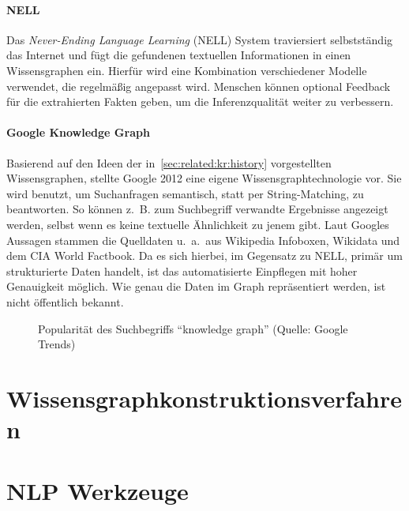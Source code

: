 \paragraph{NELL}
Das \textit{Never-Ending Language Learning} (NELL) System traviersiert selbstständig das Internet und fügt die gefundenen textuellen Informationen in einen Wissensgraphen ein.
Hierfür wird eine Kombination verschiedener Modelle verwendet, die regelmäßig angepasst wird.
Menschen können optional Feedback für die extrahierten Fakten geben, um die Inferenzqualität weiter zu verbessern.

\paragraph{Google Knowledge Graph}
Basierend auf den Ideen der in~\ref{sec:related:kr:history} vorgestellten Wissensgraphen, stellte Google 2012 eine eigene Wissensgraphtechnologie vor.
Sie wird benutzt, um Suchanfragen semantisch, statt per String-Matching, zu beantworten.
So können z.~B. zum Suchbegriff verwandte Ergebnisse angezeigt werden, selbst wenn es keine textuelle Ähnlichkeit zu jenem gibt.
Laut Googles Aussagen stammen die Quelldaten u.~a.\ aus Wikipedia Infoboxen, Wikidata und dem CIA World Factbook.
Da es sich hierbei, im Gegensatz zu NELL, primär um strukturierte Daten handelt, ist das automatisierte Einpflegen mit hoher Genauigkeit möglich.
Wie genau die Daten im Graph repräsentiert werden, ist nicht öffentlich bekannt.

\begin{figure}
	\caption{Popularität des Suchbegriffs ``knowledge graph'' (Quelle: Google Trends)}\label{fig:related:kgTrend}
\end{figure}

\section{Wissensgraphkonstruktionsverfahren}
\label{sec:related:kbc}

\section{NLP Werkzeuge}
\label{sec:related:nlp}
